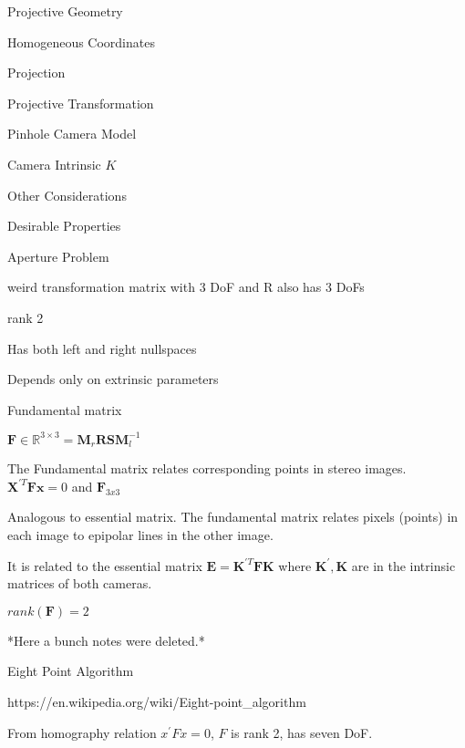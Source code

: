 \begin{section}
\begin{subsubsection}
\begin{subsubsection}
\begin{subsubsection}
\begin{section}{Projective Geometry}
\begin{subsection}{Homogeneous Coordinates}
\begin{subsubsection}
{\begin{subsubsection}{Projection}
\begin{subsubsection}{Projective Transformation}
\begin{subsection}
\begin{subsubsection}
\begin{subsubsection}
\begin{subsubsection}
{\begin{subsubsection}
\begin{subsection}
\begin{subsection} {Pinhole Camera Model}
\begin{subsection} {Camera Intrinsic $K$}
\begin{subsection}
\begin{subsection}
\begin{subsubsection}{Other Considerations}
{\begin{subsection}
\begin{subsubsection}{Desirable Properties}
\begin{section}
\begin{subsection}
\begin{subsection}
\begin{subsection}
\begin{section}
\begin{subsection}
\begin{subsubsection}
\begin{subsubsection}
\begin{subsection}
\begin{section}
\begin{subsection}
\begin{subsubsection}{Aperture Problem}
\begin{subsubsection}
{\begin{section}
\begin{subsubsection}
\begin{subsubsection}
\begin{subsubsection}
\begin{subsection}
weird transformation matrix with 3 DoF and R also has 3 DoFs

rank 2 

Has both left and right nullspaces

Depends only on extrinsic parameters

\begin{subsection} Fundamental matrix

$\mathbf F \in \mathbb{R}^{3\times3} = \mathbf{M}_r\mathbf{RSM}_l^{-1}$ 

The Fundamental matrix relates corresponding points in stereo images.
$\mathbf{X}^{\prime T}\mathbf{Fx}=0$ and $\mathbf{F}_{3x3}$

Analogous to essential matrix. The fundamental matrix relates pixels (points) in each image to epipolar lines in the other image.

It is related to the essential matrix $\mathbf{E} = \mathbf{K}^{\prime T} \mathbf{FK}$ where $\mathbf{K}^{\prime}, \mathbf{K}$ are in the intrinsic matrices of both cameras.

$rank(\mathbf{F}) = 2$

*Here a bunch notes were deleted.*


\begin{subsection} Eight Point Algorithm

https://en.wikipedia.org/wiki/Eight-point_algorithm

From homography relation $x^\prime F x = 0$, $F$ is rank 2, has seven DoF. 


\end{subsection}
\end{subsection}
\end{subsection}
\end{subsubsection}
\end{subsubsection}
\end{subsubsection}
\end{section}}
\end{subsubsection}
\end{subsubsection}
\end{subsection}
\end{section}
\end{subsection}
\end{subsubsection}
\end{subsubsection}
\end{subsection}
\end{section}
\end{subsection}
\end{subsection}
\end{subsection}
\end{section}
\end{subsubsection}
\end{subsection}}
\end{subsubsection}
\end{subsection}
\end{subsection}
\end{subsection}
\end{subsection}
\end{subsection}
\end{subsubsection}}
\end{subsubsection}
\end{subsubsection}
\end{subsubsection}
\end{subsection}
\end{subsubsection}
\end{subsubsection}}
\end{subsubsection}
\end{subsection}
\end{section}
\end{subsubsection}
\end{subsubsection}
\end{subsubsection}
\end{section}
